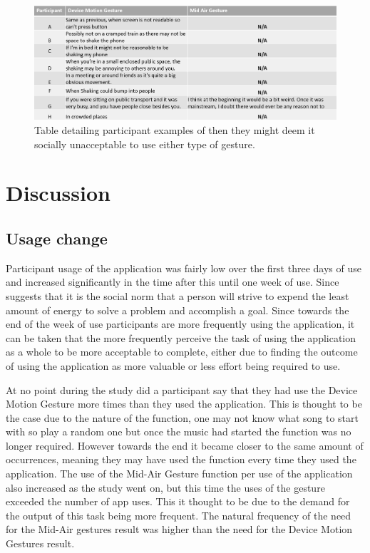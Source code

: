 \documentclass{l4proj}
\begin{document}
\begin{figure}[!htb]
    \centering
    \includegraphics[width=\textwidth]{images/problems.PNG}
        \caption{Table detailing participant examples of then they might deem it socially unacceptable to use either type of gesture.}
        \label{fig:problems}
\end{figure}



\section{Discussion} 

\subsection{Usage change}

Participant usage of the application was fairly low over the first three days of use and increased significantly in the time after this until one week of use. Since \citet{zipf_human_2016} suggests that it is the social norm that a person will strive to expend the least amount of energy to solve a problem and accomplish a goal. Since towards the end of the week of use participants are more frequently using the application, it can be taken that the more frequently perceive the task of using the application as a whole to be more acceptable to complete, either due to finding the outcome of using the application as more valuable or less effort being required to use. 

At no point during the study did a participant say that they had use the Device Motion Gesture more times than they used the application. This is thought to be the case due to the nature of the function, one may not know what song to start with so play a random one but once the music had started the function was no longer required. However towards the end it became closer to the same amount of occurrences, meaning they may have used the function every time they used the application. The use of the Mid-Air Gesture function per use of the application also increased as the study went on, but this time the uses of the gesture exceeded the number of app uses. This it thought to be due to the demand for the output of this task being more frequent. The natural frequency of the need for the Mid-Air gestures result was higher than the need for the Device Motion Gestures result.
\end{document}
